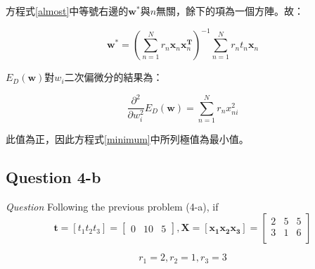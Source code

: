 \documentclass{article}
\begin{document}
方程式\ref{almost}中等號右邊的$\mathbf w^*$與$n$無關，餘下的項為一個方陣。故：

\begin{equation}\label{minimum}
\mathbf w^*=(\sum\limits_{n=1}^N r_n \mathbf x_n \mathbf x_n^{\mathbf T})^{-1}\sum\limits_{n=1}^N r_n t_n \mathbf x_n
\end{equation}

$E_D(\mathbf w)$對$w_i$二次偏微分的結果為：

\begin{equation}
\frac{\partial^2}{\partial w_i^2}E_D(\mathbf w)
=\sum\limits_{n=1}^N r_n x_{ni}^2
\end{equation}

此值為正，因此方程式\ref{minimum}中所列極值為最小值。

\subsection{Question 4-b}

\emph{Question} Following the previous problem (4-a), if
\begin{equation*}
\mathbf t = [t_1 t_2 t_3] = \begin{bmatrix}
    0&10&5
\end{bmatrix},
\mathbf X=[\mathbf{x_1 x_2 x_3}] = \begin{bmatrix}
    2 & 5 & 5 \\[0.3em]
    3 & 1 & 6 \\[0.3em]
\end{bmatrix}
\end{equation*}

\begin{equation*}
r_1 = 2, r_2 = 1, r_3 = 3
\end{equation*}
\end{document}
